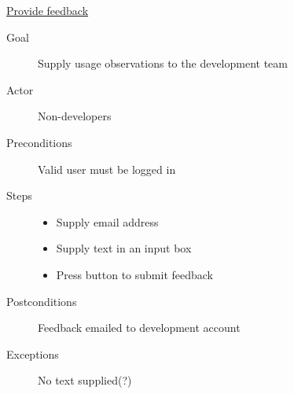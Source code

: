 \vspace{5mm}

\underline{Provide feedback}
\begin{description}
    \item[Goal] Supply usage observations to the development team
    \item[Actor] Non-developers
    \item[Preconditions] Valid user must be logged in
    \item[Steps]
        \begin{itemize}
            \item{Supply email address}
            \item{Supply text in an input box}
            \item{Press button to submit feedback}
        \end{itemize}
    \item[Postconditions] Feedback emailed to development account
    \item[Exceptions] No text supplied(?)
\end{description}

\vspace{5mm}